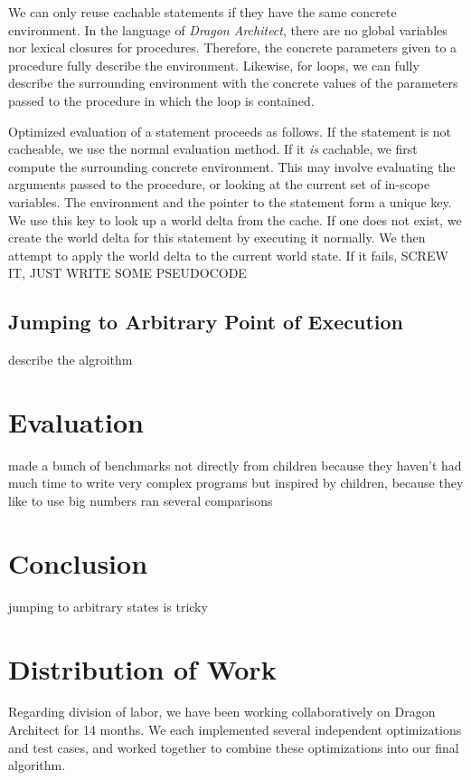 \documentclass{sig-alternate}
\newcommand{\da}{\emph{Dragon Architect}}
\begin{document}
We can only reuse cachable statements if they have the same concrete environment. In the language of \da{}, there are no global variables nor lexical closures for procedures. Therefore, the concrete parameters given to a procedure fully describe the environment. Likewise, for loops, we can fully describe the surrounding environment with the concrete values of the parameters passed to the procedure in which the loop is contained.

Optimized evaluation of a statement proceeds as follows. If the statement is not cacheable, we use the normal evaluation method. If it \emph{is} cachable, we first compute the surrounding concrete environment. This may involve evaluating the arguments passed to the procedure, or looking at the current set of in-scope variables. The environment and the pointer to the statement form a unique key. We use this key to look up a world delta from the cache. If one does not exist, we create the world delta for this statement by executing it normally. We then attempt to apply the world delta to the current world state. If it fails, SCREW IT, JUST WRITE SOME PSEUDOCODE

\subsection{Jumping to Arbitrary Point of Execution}

describe the algroithm

\section{Evaluation}
made a bunch of benchmarks
not directly from children
because they haven't had much time to write very complex programs
but inspired by children, because they like to use big numbers
ran several comparisons

\section{Conclusion}
jumping to arbitrary states is tricky

\section{Distribution of Work}
Regarding division of labor, we have been working collaboratively on Dragon Architect for 14 months. We each implemented several independent optimizations and test cases, and worked together to combine these optimizations into our final algorithm.
\end{document}
